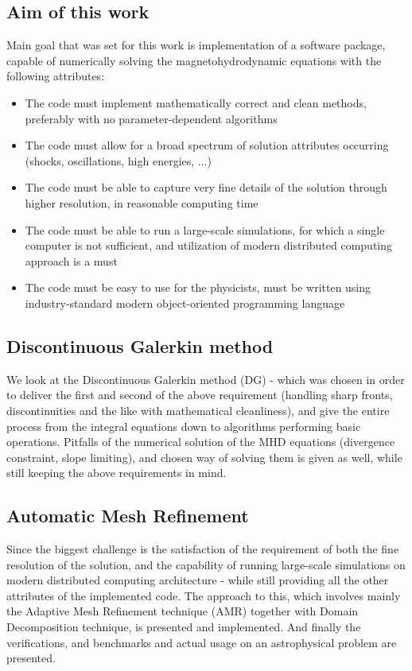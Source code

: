 \documentclass[journal,transmag]{IEEEtran}
\begin{document}
\subsection{Aim of this work}
Main goal that was set for this work is implementation of a software package, capable of numerically solving the magnetohydrodynamic equations with the following attributes:
\begin{itemize}
	\item The code must implement mathematically correct and clean methods, preferably with no parameter-dependent algorithms
	\item The code must allow for a broad spectrum of solution attributes occurring (shocks, oscillations, high energies, ...)
	\item The code must be able to capture very fine details of the solution through higher resolution, in reasonable computing time
	\item The code must be able to run a large-scale simulations, for which a single computer is not sufficient, and utilization of modern distributed computing approach is a must
	\item The code must be easy to use for the physicists, must be written using industry-standard modern object-oriented programming language
\end{itemize}
\subsection{Discontinuous Galerkin method}
We look at the Discontinuous Galerkin method (DG) - which was chosen in order to deliver the first and second of the above requirement (handling sharp fronts, discontinuities and the like with mathematical cleanliness), and give the entire process from the integral equations down to algorithms performing basic operations. Pitfalls of the numerical solution of the MHD equations (divergence constraint, slope limiting), and chosen way of solving them is given as well, while still keeping the above requirements in mind.
\subsection{Automatic Mesh Refinement}
Since the biggest challenge is the satisfaction of the requirement of both the fine resolution of the solution, and the capability of running large-scale simulations on modern distributed computing architecture - while still providing all the other attributes of the implemented code. The approach to this, which involves mainly the Adaptive Mesh Refinement technique (AMR) together with Domain Decomposition technique, is presented and implemented. And finally the verifications, and benchmarks and actual usage on an astrophysical problem are presented.
\end{document}
